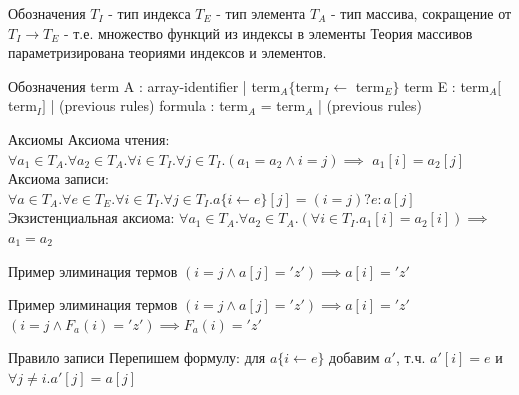 \documentclass{beamer}
\begin{document}
\begin{frame}{Обозначения}
$T_I$ - тип индекса\newline
$T_E$ - тип элемента\newline
$T_A$ - тип массива, сокращение от $T_I \rightarrow T_E$ - т.е. множество функций из индексы в элементы\newline
Теория массивов параметризирована теориями индексов и элементов.
\end{frame}

\begin{frame}{Обозначения}
term A : array-identifier | term$_A\{$term$_I \leftarrow$ term$_E\}$\newline
term E : term$_A[$term$_I]$ | (previous rules)\newline
formula : term$_A$ = term$_A$ | (previous rules)\newline
\end{frame}

\begin{frame}{Аксиомы}
Аксиома чтения:
$\forall a_1 \in T_A. \forall a_2 \in T_A. \forall i \in T_I. \forall j \in T_I. (a_1 = a_2 \wedge i = j) \implies$\newline
$a_1[i] = a_2[j]$\newline
Аксиома записи:
$\forall a \in T_A. \forall e \in T_E. \forall i \in T_I. \forall j \in T_I. a\{i\leftarrow e\}[j] = (i = j)? e : a[j]$\newline
Экзистенциальная аксиома:\newline
$\forall a_1 \in T_A. \forall a_2 \in T_A. (\forall i \in T_I. a_1[i] = a_2 [i]) \implies$\newline
$a_1 = a_2$
\end{frame}

\begin{frame}{Пример элиминация термов}
$(i = j \wedge a[j] = 'z') \implies a[i] = 'z'$\newline
\end{frame}

\begin{frame}{Пример элиминация термов}
$(i = j \wedge a[j] = 'z') \implies a[i] = 'z'$\newline
$(i = j \wedge F_a(i) = 'z') \implies F_a(i) = 'z'$\newline
\end{frame}

\begin{frame}{Правило записи}
Перепишем формулу:\newline
для $a\{i\leftarrow e\}$ добавим $a'$, т.ч. $a'[i] = e$ и $\forall j\ne i. a'[j] = a[j]$\newline
\end{frame}
\end{document}
